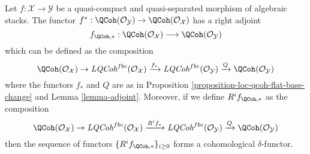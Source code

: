 \begin{proposition}
\label{proposition-direct-image-quasi-coherent}
Let $f : \mathcal{X} \to \mathcal{Y}$ be a quasi-compact and quasi-separated
morphism of algebraic stacks. The functor
$f^* : \QCoh(\mathcal{O}_\mathcal{Y}) \to
\QCoh(\mathcal{O}_\mathcal{X})$
has a right adjoint
$$
f_{\QCoh, *} :
\QCoh(\mathcal{O}_\mathcal{X})
\longrightarrow
\QCoh(\mathcal{O}_\mathcal{Y})
$$
which can be defined as the composition
$$
\QCoh(\mathcal{O}_\mathcal{X}) \to
\textit{LQCoh}^{fbc}(\mathcal{O}_\mathcal{X})
\xrightarrow{f_*} \textit{LQCoh}^{fbc}(\mathcal{O}_\mathcal{Y})
\xrightarrow{Q} \QCoh(\mathcal{O}_\mathcal{Y})
$$
where the functors $f_*$ and $Q$ are as in
Proposition \ref{proposition-loc-qcoh-flat-base-change}
and
Lemma \ref{lemma-adjoint}.
Moreover, if we define $R^if_{\QCoh, *}$ as the composition
$$
\QCoh(\mathcal{O}_\mathcal{X}) \to
\textit{LQCoh}^{fbc}(\mathcal{O}_\mathcal{X})
\xrightarrow{R^if_*} \textit{LQCoh}^{fbc}(\mathcal{O}_\mathcal{Y})
\xrightarrow{Q} \QCoh(\mathcal{O}_\mathcal{Y})
$$
then the sequence of functors $\{R^if_{\QCoh, *}\}_{i \geq 0}$
forms a cohomological $\delta$-functor.
\end{proposition}

